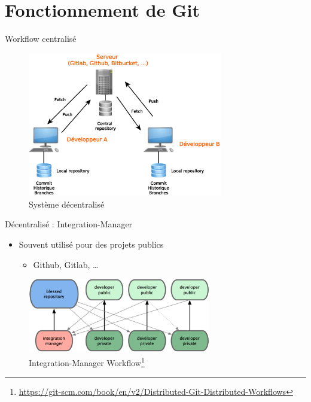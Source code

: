 \documentclass[xcolor=x11names,compress]{beamer}
\begin{document}
\section{Fonctionnement de Git}
\begin{frame}{Workflow centralisé}
	\begin{figure}[H]
		\centering
		\includegraphics[width=8.5cm]{images/1-bases/git-repo.eps}
		\caption{Système décentralisé}
	\end{figure}
\end{frame}

\begin{frame}{Décentralisé : Integration-Manager}
	\begin{itemize}
		\item Souvent utilisé pour des projets publics 
			\begin{itemize}
				\item Github, Gitlab, \ldots
			\end{itemize}
	\end{itemize}
	\begin{figure}[H]
		\centering
		\includegraphics[width=8cm]{images/1-bases/integration-manager-wf.png}
		\caption{Integration-Manager Workflow\footnote{\tiny{\url{https://git-scm.com/book/en/v2/Distributed-Git-Distributed-Workflows}}}}
	\end{figure}
\end{frame}
\end{document}
